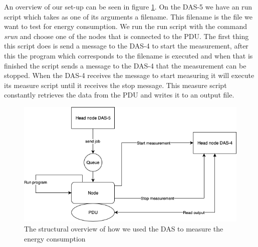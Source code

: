 An overview of our set-up can be seen in figure \ref{fig:overview}. On the DAS-5 we have an run script which takes as one of its arguments a filename. This filename is the file we want to test for energy consumption. We run the run script with the command \textit{srun} and choose one of the nodes that is connected to the PDU. The first thing this script does is send a message to the DAS-4 to start the measurement, after this the program which corresponds to the filename is executed and when that is finished the script sends a message to the DAS-4 that the measurement can be stopped. When the DAS-4 receives the message to start measuring it will execute its measure script until it receives the stop message. This measure script constantly retrieves the data from the PDU and writes it to an output file.

\begin{figure}[h]
    \centering
    \includegraphics[width=.6\textwidth]{graphs/das.png}
    \caption{The structural overview of how we used the DAS to measure the energy consumption}
    \label{fig:overview}
\end{figure}
